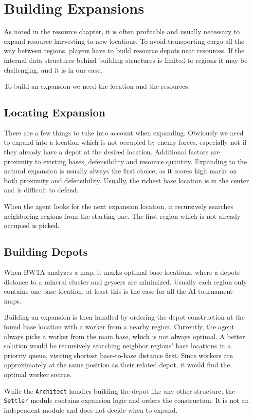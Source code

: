 \section{Building Expansions}
As noted in the resource chapter, it is often profitable and usually necessary to expand resource harvesting to new locations. To avoid transporting cargo all the way between regions, players have to build resource depots near resources. If the internal data structures behind building structures is limited to regions it may be challenging, and it is in our case.

To build an expansion we need the location and the resources.

	\subsection*{Locating Expansion}
	There are a few things to take into account when expanding. Obviously we need to expand into a location which is not occupied by enemy forces, especially not if they already have a depot at the desired location. Additional factors are proximity to existing bases, defensibility and resource quantity. Expanding to the natural expansion is usually always the first choice, as it scores high marks on both proximity and defensibility. Usually, the richest base location is in the center and is difficult to defend.
	
	When the agent looks for the next expansion location, it recursively searches neighboring regions from the starting one. The first region which is not already occupied is picked.
	
	\subsection*{Building Depots}
	When BWTA analyzes a map, it marks optimal base locations, where a depots distance to a mineral cluster and geysers are minimized. Usually each region only contains one base location, at least this is the case for all the AI tournament maps.
	
	Building an expansion is then handled by ordering the depot construction at the found base location with a worker from a nearby region. Currently, the agent always picks a worker from the main base, which is not always optimal. A better solution would be recursively searching neighbor regions' base locations in a priority queue, visiting shortest base-to-base distance first. Since workers are approximately at the same position as their related depot, it would find the optimal worker source.

	While the \texttt{Architect} handles building the depot like any other structure, the \texttt{Settler} module contains expansion logic and orders the construction. It is not an independent module and does not decide when to expand.